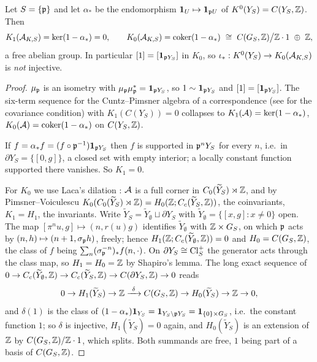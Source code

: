 \begin{proposition}\label{II:prop:K}
Let $S=\{\mathfrak{p}\}$ and let $\alpha_*$ be the endomorphism $\mathbf 1_U\mapsto\mathbf 1_{\mathfrak{p} U}$
of $K^0(Y_S)=C(Y_S,\mathbb{Z})$. Then
\begin{equation}\label{II:eq:K}
K_1(\cA_{K,S})=\ker(1-\alpha_*)=0,
\qquad
K_0(\cA_{K,S})=\coker(1-\alpha_*)\ \cong\ C(G_S,\Z)\big/\Z\cdot1\ \oplus\ \Z ,
\end{equation}
a free abelian group. In particular $[1]=[\mathbf 1_{\mathfrak{p} Y_S}]$ in $K_0$, so
$\iota_*:K^0(Y_S)\to K_0(\mathcal{A}_{K,S})$ is \emph{not} injective.
\end{proposition}

\begin{proof}
$\mu_{\mathfrak{p}}$ is an isometry with $\mu_{\mathfrak{p}}\mu_{\mathfrak{p}}^*=\mathbf 1_{\mathfrak{p} Y_S}$, so
$1\sim\mathbf 1_{\mathfrak{p} Y_S}$ and $[1]=[\mathbf 1_{\mathfrak{p} Y_S}]$. The six-term sequence for the
Cuntz--Pimsner algebra of a correspondence \cite[\S4]{Pimsner} (see \cite{Katsura} for the
covariance condition) with $K_1(C(Y_S))=0$ collapses to
$K_1(\mathcal{A})=\ker(1-\alpha_*)$, $K_0(\mathcal{A})=\operatorname{coker}(1-\alpha_*)$ on $C(Y_S,\mathbb{Z})$.

If $f=\alpha_*f=(f\circ\mathfrak{p}^{-1})\mathbf 1_{\mathfrak{p} Y_S}$ then $f$ is supported in $\mathfrak{p}^nY_S$
for every $n$, i.e.\ in $\partial Y_S=\{[0,g]\}$, a closed set with empty interior; a
locally constant function supported there vanishes. So $K_1=0$.

For $K_0$ we use Laca's dilation \cite{Laca}: $\mathcal{A}$ is a full corner in
$C_0(\widetilde Y_S)\rtimes\mathbb{Z}$, and by Pimsner--Voiculescu \cite{PV}
$K_0(C_0(\widetilde Y_S)\rtimes\mathbb{Z})=H_0(\mathbb{Z};C_c(\widetilde Y_S,\mathbb{Z}))$, the coinvariants,
$K_1=H_1$, the invariants. Write $\widetilde Y_S=\widetilde Y_\emptyset\sqcup\partial Y_S$
with $\widetilde Y_\emptyset=\{[x,g]:x\ne0\}$ open. The map
$[\pi^nu,g]\mapsto(n,r(u)g)$ identifies $\widetilde Y_\emptyset$ with $\mathbb{Z}\times G_S$, on which
$\mathfrak{p}$ acts by $(n,h)\mapsto(n+1,\sigma_{\mathfrak{p}} h)$, freely; hence
$H_1(\mathbb{Z};C_c(\widetilde Y_\emptyset,\mathbb{Z}))=0$ and $H_0=C(G_S,\mathbb{Z})$, the class of $f$ being
$\sum_n(\sigma_{\mathfrak{p}}^{-n})_*f(n,\cdot)$. On $\partial Y_S\cong\operatorname{Cl}^+_S$ the generator acts
through the class map, so $H_1=H_0=\mathbb{Z}$ by Shapiro's lemma. The long exact sequence of
$0\to C_c(\widetilde Y_\emptyset,\mathbb{Z})\to C_c(\widetilde Y_S,\mathbb{Z})\to C(\partial Y_S,\mathbb{Z})\to0$
reads
\[
0\to H_1(\widetilde Y_S)\to\mathbb{Z}\xrightarrow{\ \delta\ }C(G_S,\mathbb{Z})\to H_0(\widetilde Y_S)\to\mathbb{Z}\to0,
\]
and $\delta(1)$ is the class of $(1-\alpha_*)\mathbf 1_{Y_S}=\mathbf 1_{Y_S\setminus\mathfrak{p} Y_S}
=\mathbf 1_{\{0\}\times G_S}$, i.e.\ the constant function $1$; so $\delta$ is injective,
$H_1(\widetilde Y_S)=0$ again, and $H_0(\widetilde Y_S)$ is an extension of $\mathbb{Z}$ by
$C(G_S,\mathbb{Z})/\mathbb{Z}\cdot1$, which splits. Both summands are free, $1$ being part of a basis of
$C(G_S,\mathbb{Z})$.
\end{proof}

